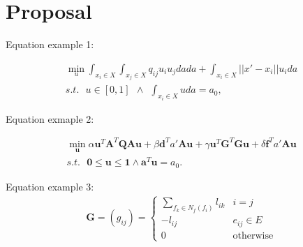 \chapter{Proposal}
\label{cha:Proposal}

Equation example 1:

\begin{equation}
\begin{split}
\min_u \int_{x_i\in X}\int_{x_j\in X} q_{ij} u_i u_j da da + \int_{x_i\in X}||x' - x_i|| u_i da \\
s.t. \ \ \ u\in[0,1] \ \ \land  \ \ \int_{x_i\in X}u da = a_0,
\end{split}
\end{equation}

Equation exmaple 2:

\begin{equation}
\begin{split}
\min_{\mathbf{u}} \alpha \mathbf{u}^T \mathbf{A}^T \mathbf{Q} \mathbf{A} \mathbf{u} +  \beta \mathbf{d}^T a' \mathbf{A} \mathbf{u} + \gamma \mathbf{u}^T \mathbf{G}^T \mathbf{G} \mathbf{u} + \delta\mathbf{f}^T a' \mathbf{A} \mathbf{u} \\
s.t. \ \ \ \mathbf{0} \leq \mathbf{u} \leq \mathbf{1} \land \mathbf{a}^T\mathbf{u}=a_0.
\end{split}
\end{equation}

Equation example 3:
\begin{align}
\mathbf{G}=(g_{ij}) = \left\lbrace
\begin{array}{ll}
\sum_{f_k\in N_f(f_i)} l_{ik} & i=j\\
-l_{ij} & e_{ij}\in E\\
0 & \text{otherwise}
\end{array}
\right.
\end{align}




